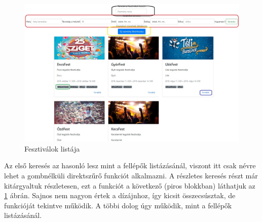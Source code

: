 \begin{figure}
\centering
\includegraphics[scale=0.45]{kepek/festList.jpg}
\caption{Fesztiválok listája}
\label{fig:festList}
\end{figure}

Az első keresés az hasonló lesz mint a fellépők listázásánál, viszont itt csak névre lehet a gombnélküli direktszűrő funkciót alkalmazni. A részletes keresés részt már kitárgyaltuk részletesen, ezt a funkciót a következő (piros blokkban) láthatjuk az \ref{fig:festList} ábrán. Sajnos nem nagyon értek a dízájnhoz, így kicsit összecsúsztak, de funkcióját tekintve működik. A többi dolog úgy működik, mint a fellépők listázásánál.

